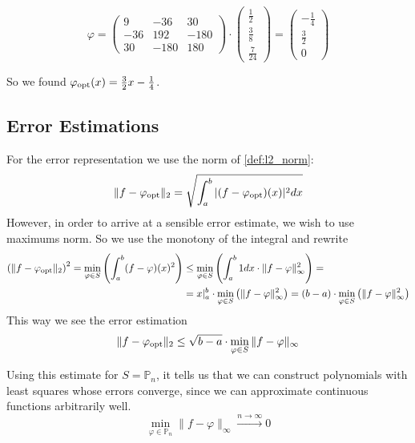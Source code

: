 \begin{enumerate}
      \[\varphi = \begin{pmatrix}9&-36&30\\-36&192&-180\\30&-180&180\end{pmatrix} \cdot \begin{pmatrix}\frac{1}{2}\\\frac{3}{8}\\\frac{7}{24}\end{pmatrix} = \begin{pmatrix}-\frac{1}{4}\\ \frac{3}{2}\\ 0\end{pmatrix}\]
\end{enumerate}
So we found \(\varphi_{\operatorname{opt}}(x) = \frac{3}{2}x - \frac{1}{4}\).
\begin{center}
   
\end{center}

\subsection{Error Estimations}
For the error representation we use the norm of \cref{def:l2_norm}:
\[\|f - \varphi_{\operatorname{opt}}\|_2 = \sqrt{\int_a^b |(f - \varphi_{\operatorname{opt}})(x)|^2 dx}\]
However, in order to arrive at a sensible error estimate, we wish to use maximums norm.
So we use the monotony of the integral and rewrite
\begin{equation*}
   \begin{split}
      \left(\|f - \varphi_{\operatorname{opt}}\|_2\right)^2 = \min_{\varphi \in S}\left(\int_a^b (f - \varphi)(x)^2\right) & \leq \min_{\varphi \in S}\left(\int_a^b 1 dx \cdot \|f - \varphi\|_{\infty}^2\right) = \\
                                                                                                             & = x\rvert_a^b \cdot \min_{\varphi \in S}\left(\|f - \varphi\|_{\infty}^2\right) = (b-a) \cdot \min_{\varphi \in S}\left(\|f - \varphi\|_{\infty}^2\right)
   \end{split}
\end{equation*}
This way we see the error estimation
\[\|f - \varphi_{\operatorname{opt}}\|_2 \leq \sqrt{b - a} \cdot \min_{\varphi \in S} \|f - \varphi\|_\infty\]

Using this estimate for \(S = \mathbb{P}_n\), it tells us that we can construct polynomials with least squares whose errors converge, since we can approximate continuous functions arbitrarily well.
\[\min_{\varphi \in \mathbb{P}_n} \|f - \varphi\|_\infty \xrightarrow{n \to \infty} 0\]

